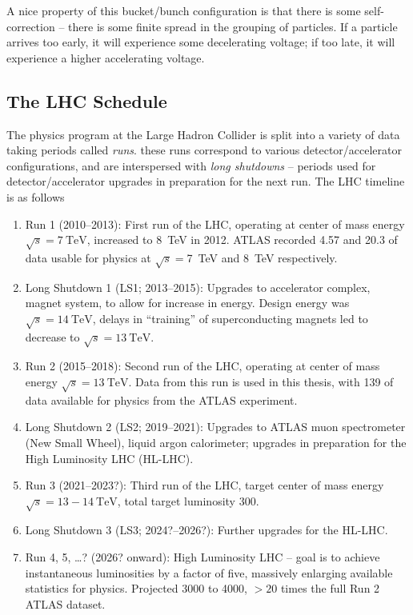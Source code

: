 A nice property of this bucket/bunch configuration is that there is some self-correction -- there is 
some finite spread in the grouping of particles. If a particle arrives too early, it will experience some 
decelerating voltage; if too late, it will experience a higher accelerating voltage.

\subsection{The LHC Schedule}
The physics program at the Large Hadron Collider is split into a variety of data taking periods called \emph{runs}.
these runs correspond to various detector/accelerator configurations, and are interspersed with \emph{long shutdowns} -- 
periods used for detector/accelerator upgrades in preparation for the next run. The LHC timeline is as follows 
\begin{enumerate}
	\item Run 1 (2010--2013): First run of the LHC, operating at center of mass energy $\sqrt{s}=\SI{7}{\TeV}$, 
	increased to \SI{8}{\TeV} in 2012. ATLAS recorded \SI{4.57}{\ifb} and \SI{20.3}{\ifb} of data usable for physics
	at $\sqrt{s}=$\SI{7}{\TeV} and \SI{8}{\TeV} respectively.
	\item Long Shutdown 1 (LS1; 2013--2015): Upgrades to accelerator complex, magnet system, to allow for increase 
	in energy. Design energy was $\sqrt{s}=\SI{14}{\TeV}$, delays in ``training'' of superconducting magnets 
	led to decrease to $\sqrt{s}=\SI{13}{\TeV}$.
	\item Run 2 (2015--2018): Second run of the LHC, operating at center of mass energy $\sqrt{s}=\SI{13}{\TeV}$. 
	Data from this run is used in this thesis, with \SI{139}{\ifb} of data available for physics from the ATLAS
	experiment.
	\item Long Shutdown 2 (LS2; 2019--2021): Upgrades to ATLAS muon spectrometer (New Small Wheel), liquid argon 
	calorimeter; upgrades in preparation for the High Luminosity LHC (HL-LHC).
	\item Run 3 (2021--2023?): Third run of the LHC, target center of mass energy $\sqrt{s}=13-\SI{14}{\TeV}$, 
	total target luminosity \SI{300}{\ifb}.
	\item Long Shutdown 3 (LS3; 2024?--2026?): Further upgrades for the HL-LHC.
	\item Run 4, 5, \ldots ? (2026? onward): High Luminosity LHC -- goal is to achieve instantaneous luminosities 
	by a factor of five, massively enlarging available statistics for physics. Projected 3000 to \SI{4000}{\ifb}, 
	$> 20$ times the full Run 2 ATLAS dataset.
\end{enumerate}


